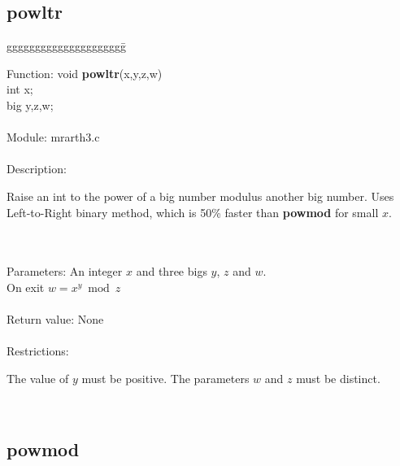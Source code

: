 \subsection{powltr}

\begin{tabbing}
ggggggggggggggggggggg\= \kill

      Function:      \>void {\bf powltr}(x,y,z,w) \\
                     \>int x; \\
                     \>big y,z,w; \\
      \ \\
      Module:        \>mrarth3.c \\
      \ \\
      Description:   \>
                     \parbox[t]{3in}
                     {Raise an int to the power of a big number modulus 
                      another big number. Uses
                      Left-to-Right binary method, which is 50\% faster than 
                      {\bf powmod} for small $x$.}  \\
      \ \\
      Parameters:    \>An integer $x$ and three bigs $y$, $z$ and $w$. \\
                     \>On exit $w=x^y \bmod z$  \\
      \ \\
      Return value:  \>None \\
      \ \\
      Restrictions:  \>
                     \parbox[t]{3 in}
                     {The value of $y$ must be positive. The parameters $w$
                      and $z$ must be distinct.} \\

\end{tabbing}

\subsection{powmod}

